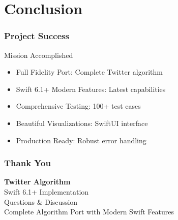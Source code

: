 \documentclass[aspectratio=169]{beamer}
\begin{document}
\section{Conclusion}

\begin{frame}
    \frametitle{Project Success}
    \begin{block}{Mission Accomplished}
        \begin{itemize}
            \item \checkmark Full Fidelity Port: Complete Twitter algorithm
            \item \checkmark Swift 6.1+ Modern Features: Latest capabilities
            \item \checkmark Comprehensive Testing: 100+ test cases
            \item \checkmark Beautiful Visualizations: SwiftUI interface
            \item \checkmark Production Ready: Robust error handling
        \end{itemize}
    \end{block}
\end{frame}

\begin{frame}
    \frametitle{Thank You}
    \begin{center}
        {\Large\color{twitterblue}\textbf{Twitter Algorithm}}\\[0.5cm]
        {\large\color{swiftorange}Swift 6.1+ Implementation}\\[1cm]
        {\large Questions \& Discussion}\\[0.5cm]
        {\large Complete Algorithm Port with Modern Swift Features}
    \end{center}
\end{frame}
\end{document}
